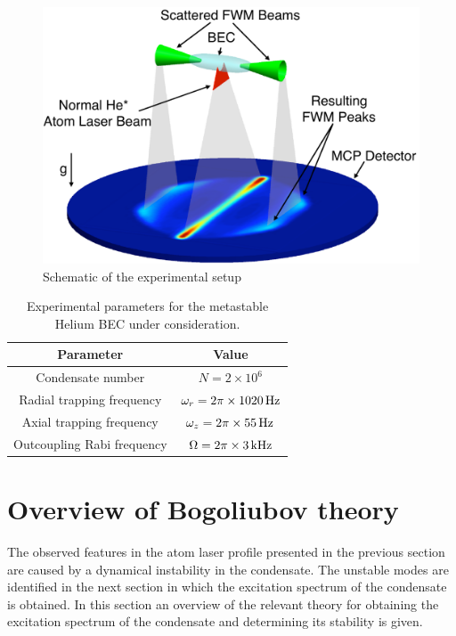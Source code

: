 \begin{figure}
    \centering
        \includegraphics[height=3in]{Schematic}
    \caption{Schematic of the experimental setup}
    \label{Peaks:Schematic}
\end{figure}


\begin{table}
    \centering
    \begin{tabular}{cc}
    \toprule
    Parameter & Value\\
    \midrule
    Condensate number & $N = 2\times 10^6$\\
    Radial trapping frequency & $\omega_r = 2 \pi \times \unit[1020]{Hz}$\\
    Axial trapping frequency & $\omega_z = 2\pi \times \unit[55]{Hz}$\\
    Outcoupling Rabi frequency & $\Omega = 2\pi \times \unit[3]{kHz}$\\
    \bottomrule
    \end{tabular}
    \caption{Experimental parameters for the metastable Helium BEC under consideration.}
    \label{Peaks:ExperimentalParameters}
\end{table}

\section{Overview of Bogoliubov theory}
\label{Peaks:ElementaryExcitations}

The observed features in the atom laser profile presented in the previous section are caused by a dynamical instability in the condensate. The unstable modes are identified in the next section in which the excitation spectrum of the condensate is obtained. In this section an overview of the relevant theory for obtaining the excitation spectrum of the condensate and determining its stability is given.


